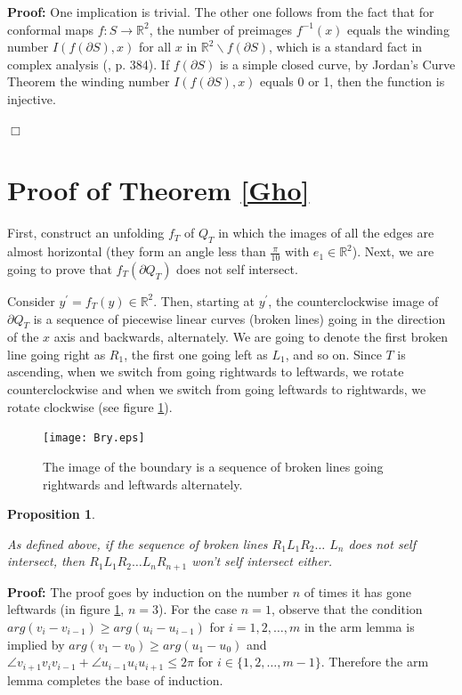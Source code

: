 \documentclass[openright, 12pt]{article}
\newtheorem{prop}[teorema]{Proposition}
\newcommand{\field}[1]{\ensuremath{\mathbb{#1}}}
\newcommand{\R}{\field{R}}
\begin{document}
\textbf{Proof: }One implication is trivial. The other one follows from the fact that for conformal maps $f: S \rightarrow \mathbb{R}^2$, the number of preimages $f^{-1}(x)$ equals the winding number $I(f(\partial S), x )$ for all $x$ in $\R^2  \backslash f(\partial S)$, which is a standard fact in complex analysis (\cite{Ma}, p. 384). If $f(\partial S)$ is a simple closed curve, by Jordan's Curve Theorem \cite{Ha} the winding number $I(f(\partial S), x )$ equals 0 or 1, then the function is injective.


\hfill $\Box$

\section*{Proof of Theorem \ref{Gho}}

First, construct an unfolding $f_T$ of $Q_T$ in which the images of all the edges are almost horizontal (they form an angle less than $\frac{\pi}{10}$ with $e_1 \in \R ^2$). Next, we are going to prove that $f_T(\partial Q_T)$ does not self intersect.

Consider $y^{\prime} = f_T(y) \in \R ^2$. Then, starting at $y^{\prime}$, the counterclockwise image of $\partial Q_T$ is a sequence of piecewise linear curves (broken lines) going in the direction of the $x$ axis and backwards, alternately. We are going to denote the first broken line going right as $R_1$, the first one going left as $L_1$, and so on. Since $T$ is ascending, when we switch from going rightwards to leftwards, we rotate counterclockwise and when we switch from going leftwards to rightwards, we rotate clockwise (see figure \ref{Cro}). 



\begin{figure}[h]
\centering
{}
\texttt{[image: Bry.eps]}
\caption{The image of the boundary is a sequence of broken lines going rightwards and leftwards alternately.}\label{Cro}
\end{figure}




\begin{prop}\label{Zig}
{\rm As defined above, if the sequence of broken lines $R_1L_1R_2\ldots$ 
$ L_n$ does not self intersect, then $R_1L_1 R_2 \ldots L_nR_{n+1}$ won't self intersect either.  

}
\end{prop}




\textbf{Proof: }The proof goes by induction on the number $n$ of times it has gone leftwards (in figure \ref{Cro}, $n=3$). For the case $n=1$, observe that the condition $arg (v_{i} - v_{i-1} )\geq arg (u_{i} - u_{i-1})$ for $i =1, 2, \ldots, m$ in the arm lemma is implied by $arg (v_1 - v_0 )\geq arg (u_1 - u_0)$ and $\angle v_{i+1}v_iv_{i-1}+ \angle u_{i-1}u_iu_{i+1} \leq 2\pi$ for $i\in \{ 1,2, \ldots, m-1\}$. Therefore the arm lemma completes the base of induction.
\end{document}
